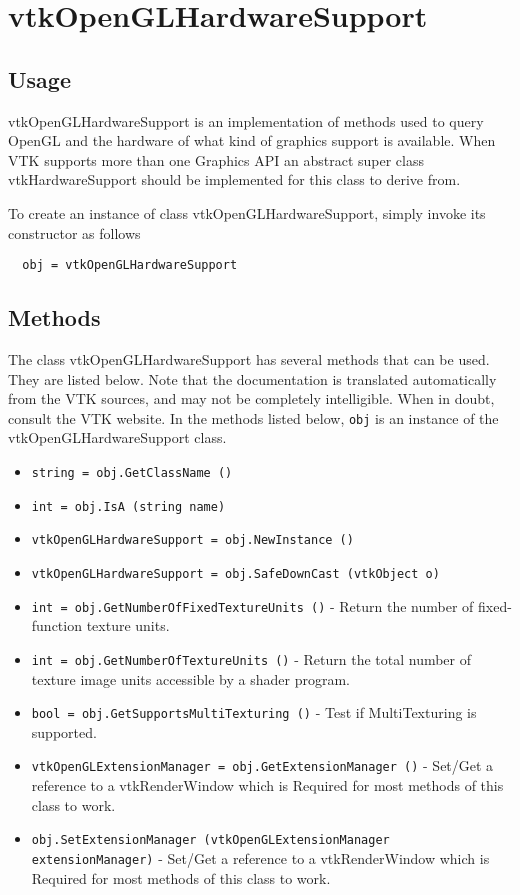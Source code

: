 \section{vtkOpenGLHardwareSupport}

\subsection{Usage}

 vtkOpenGLHardwareSupport is an implementation of methods used
 to query OpenGL and the hardware of what kind of graphics support
 is available. When VTK supports more than one Graphics API an
 abstract super class vtkHardwareSupport should be implemented
 for this class to derive from.

To create an instance of class vtkOpenGLHardwareSupport, simply
invoke its constructor as follows
\begin{verbatim}
  obj = vtkOpenGLHardwareSupport
\end{verbatim}
\subsection{Methods}

The class vtkOpenGLHardwareSupport has several methods that can be used.
  They are listed below.
Note that the documentation is translated automatically from the VTK sources,
and may not be completely intelligible.  When in doubt, consult the VTK website.
In the methods listed below, \verb|obj| is an instance of the vtkOpenGLHardwareSupport class.
\begin{itemize}
\item  \verb|string = obj.GetClassName ()|

\item  \verb|int = obj.IsA (string name)|

\item  \verb|vtkOpenGLHardwareSupport = obj.NewInstance ()|

\item  \verb|vtkOpenGLHardwareSupport = obj.SafeDownCast (vtkObject o)|

\item  \verb|int = obj.GetNumberOfFixedTextureUnits ()| -  Return the number of fixed-function texture units.

\item  \verb|int = obj.GetNumberOfTextureUnits ()| -  Return the total number of texture image units accessible by a shader
 program.

\item  \verb|bool = obj.GetSupportsMultiTexturing ()| -  Test if MultiTexturing is supported.

\item  \verb|vtkOpenGLExtensionManager = obj.GetExtensionManager ()| -  Set/Get a reference to a vtkRenderWindow which is Required
 for most methods of this class to work.

\item  \verb|obj.SetExtensionManager (vtkOpenGLExtensionManager extensionManager)| -  Set/Get a reference to a vtkRenderWindow which is Required
 for most methods of this class to work.

\end{itemize}
